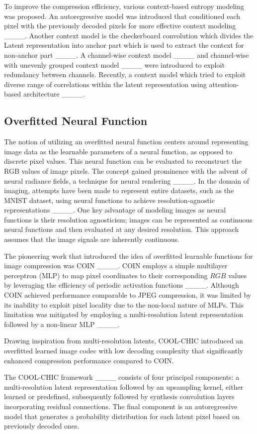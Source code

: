 To improve the compression efficiency, various context-based entropy modeling was proposed. An autoregressive model was introduced that conditioned each pixel with the previously decoded pixels for more effective context modeling ____. Another context model is the checkerboard convolution which divides the Latent representation into anchor part which is used to extract the context for non-anchor part ____.  A channel-wise context model ____ and channel-wise with unevenly grouped context model ____ were introduced to exploit redundancy between channels. Recently, a context model which tried to exploit diverse range of correlations within the latent representation using attention-based architecture ____. 

\subsection{Overfitted Neural Function}\label{sec:Overfitted_Neural_Function}

The notion of utilizing an overfitted neural function centers around representing image data as the learnable parameters of a neural function, as opposed to discrete pixel values. This neural function can be evaluated to reconstruct the RGB values of image pixels. The concept gained prominence with the advent of neural radiance fields, a technique for neural rendering ____. In the domain of imaging, attempts have been made to represent entire datasets, such as the MNIST dataset, using neural functions to achieve resolution-agnostic representations ____. One key advantage of modeling images as neural functions is their resolution agnosticism; images can be represented as continuous neural functions and then evaluated at any desired resolution. This approach assumes that the image signals are inherently continuous.

The pioneering work that introduced the idea of overfitted learnable functions for image compression was COIN ____. COIN employs a simple multilayer perceptron (MLP) to map pixel coordinates to their corresponding $RGB$ values by leveraging the efficiency of periodic activation functions ____. Although COIN achieved performance comparable to JPEG compression, it was limited by its inability to exploit pixel locality due to the non-local nature of MLPs. This limitation was mitigated by employing a multi-resolution latent representation followed by a non-linear MLP ____.

Drawing inspiration from multi-resolution latents, COOL-CHIC introduced an overfitted learned image codec with low decoding complexity that significantly enhanced compression performance compared to COIN.

The COOL-CHIC framework ____ consists of four principal components: a multi-resolution latent representation followed by an upsampling kernel, either learned or predefined, subsequently followed by synthesis convolution layers incorporating residual connections. The final component is an autoregressive model that generates a probability distribution for each latent pixel based on previously decoded ones.